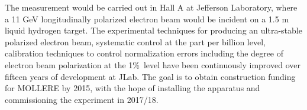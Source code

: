 The measurement would be carried out in Hall A at Jefferson Laboratory, where a 11 GeV longitudinally polarized electron beam would be incident on a 1.5 m liquid hydrogen target.
The experimental techniques for producing an ultra-stable polarized electron beam, systematic
control at the part per billion level, calibration techniques to control normalization errors including the degree of electron 
beam polarization at the 1\%\ level have been continuously improved over fifteen years of development at JLab. The goal is to obtain construction funding for MOLLERE by 2015, with 
the hope of installing the apparatus and commissioning the experiment in 2017/18.


 


